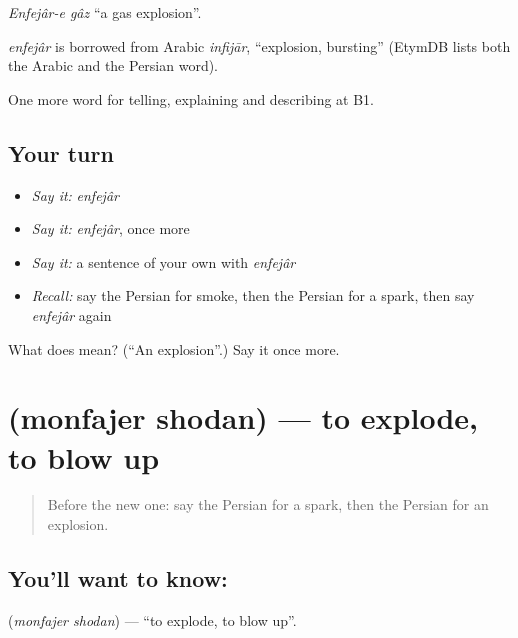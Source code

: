 \emph{Enfejâr-e gâz} \textquotedblleft{}a gas explosion\textquotedblright{}.

\begin{cousinweb}
\emph{enfejâr} is borrowed from Arabic \emph{infijār}, \textquotedblleft{}explosion, bursting\textquotedblright{} (EtymDB lists both the Arabic and the Persian word).
\end{cousinweb}

\begin{grammarlens}[title={What you've built}]
One more word for telling, explaining and describing at B1.
\end{grammarlens}

\subsection*{Your turn}
\begin{itemize}
\raggedright
  \item \emph{Say it:} \emph{enfejâr}
  \item \emph{Say it:} \emph{enfejâr}, once more
  \item \emph{Say it:} a sentence of your own with \emph{enfejâr}
  \item \emph{Recall:} say the Persian for smoke, then the Persian for a spark, then say \emph{enfejâr} again
\end{itemize}

\begin{tcolorbox}[breakable,colback=teal!4,colframe=teal!35!black,title={Before you move on}]
What does  mean? (\textquotedblleft{}An explosion\textquotedblright{}.) Say it once more.
\end{tcolorbox}
\section[\texorpdfstring{\fa{منفجر} \fa{شدن} (monfajer shodan)}{منفجر شدن (monfajer shodan)}]{  (monfajer shodan) — to explode, to blow up}

\label{lesson:FA-C329-monfajer-shodan}



\begin{quote}
Before the new one: say the Persian for a spark, then the Persian for an explosion.
\end{quote}

\subsection*{You'll want to know:  }
\textbf{ } (\emph{monfajer shodan}) — \textquotedblleft{}to explode, to blow up\textquotedblright{}.

